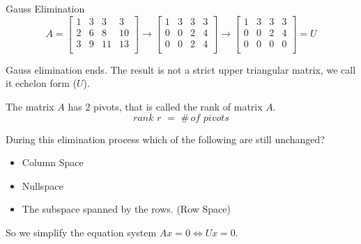 \documentclass{beamer}
\begin{document}
\begin{frame}{Gauss Elimination}
\begin{equation*}
    A=\left[ \begin{matrix}
        1&		3&		3&		3\\
        2&		6&		8&		10\\
        3&		9&		11&		13\\
    \end{matrix} \right] \rightarrow \left[ \begin{matrix}
        1&		3&		3&		3\\
        0&		0&		2&		4\\
        0&		0&		2&		4\\
    \end{matrix} \right] \rightarrow \left[ \begin{matrix}
        1&		3&		3&		3\\
        0&		0&		2&		4\\
        0&		0&		0&		0\\
    \end{matrix} \right] =U
\end{equation*}

Gauss elimination ends. The result is not a strict upper triangular matrix, we call it echelon form ($U$).

\vspace{3pt}
The matrix $A$ has 2 pivots, that is called the \alert{rank} of matrix $A$.
\begin{equation*}
    rank\,\,r\,\,=\,\,\# \,of\,\,pivots
\end{equation*}

During this elimination process which of the following are still unchanged?

\begin{itemize}
    \item Column Space
    \item Nullspace
    \item The subspace spanned by the rows. (Row Space)
\end{itemize}

So we simplify the equation system $Ax=0\Leftrightarrow Ux=0$.
\end{frame}
\end{document}
